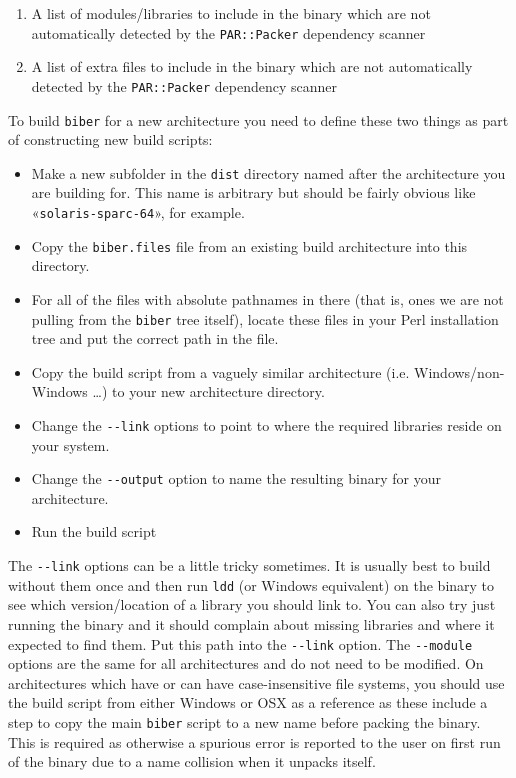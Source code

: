 \documentclass{ltxdockit}
\begin{document}
\begin{enumerate}
\item A list of modules/libraries to include in the binary which are not
  automatically detected by the \verb+PAR::Packer+ dependency
  scanner
\item A list of extra files to include in the binary which are not
  automatically detected by the \verb+PAR::Packer+ dependency
  scanner
\end{enumerate}

\noindent To build \verb+biber+ for a new architecture you need to
define these two things as part of constructing new build scripts:

\begin{itemize}
\item Make a new subfolder in the \verb+dist+ directory named after the
  architecture you are building for. This name is arbitrary but should
  be fairly obvious like «\verb+solaris-sparc-64+», for example.
\item Copy the \verb+biber.files+ file from an existing build
  architecture into this directory.
\item For all of the files with absolute pathnames in there (that is,
  ones we are not pulling from the \verb+biber+ tree itself), locate these
  files in your Perl installation tree and put the correct path in the
  file.
\item Copy the build script from a vaguely similar architecture
  (i.e. Windows/non-Windows \ldots) to your new architecture
  directory. 
\item Change the \verb+--link+ options to point to where the required
  libraries reside on your system.
\item Change the \verb+--output+ option to name the resulting binary
  for your architecture.
\item Run the build script
\end{itemize}

\noindent The \verb+--link+ options can be a little tricky
sometimes. It is usually best to build without them once and then run
\verb+ldd+ (or Windows equivalent) on the binary to see which
version/location of a library you should link to. You can also try
just running the binary and it should complain about missing libraries
and where it expected to find them. Put this path into the
\verb+--link+ option. The \verb+--module+ options are the same for all
architectures and do not need to be modified.
On architectures which have or can have case-insensitive file systems,
you should use the build script from either Windows or OSX as a reference
as these include a step to copy the main \verb+biber+ script to a new name
before packing the binary. This is required as otherwise a spurious
error is reported to the user on first run of the binary due to a name
collision when it unpacks itself.
\end{document}
